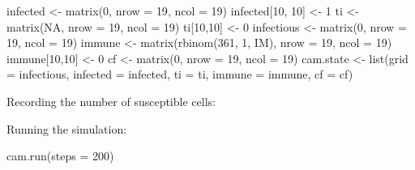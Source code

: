 \documentclass[
  12pt,
  a4paper]{book}
\newenvironment{Shaded}{\begin{snugshade}}{\end{snugshade}}
\newcommand{\AttributeTok}[1]{\textcolor[rgb]{0.77,0.63,0.00}{#1}}
\newcommand{\ConstantTok}[1]{\textcolor[rgb]{0.00,0.00,0.00}{#1}}
\newcommand{\DecValTok}[1]{\textcolor[rgb]{0.00,0.00,0.81}{#1}}
\newcommand{\FunctionTok}[1]{\textcolor[rgb]{0.00,0.00,0.00}{#1}}
\newcommand{\NormalTok}[1]{#1}
\newcommand{\OtherTok}[1]{\textcolor[rgb]{0.56,0.35,0.01}{#1}}
\newcommand{\SpecialCharTok}[1]{\textcolor[rgb]{0.00,0.00,0.00}{#1}}
\begin{document}
\begin{Shaded}
\begin{Highlighting}[]
\NormalTok{infected }\OtherTok{\textless{}{-}} \FunctionTok{matrix}\NormalTok{(}\DecValTok{0}\NormalTok{, }\AttributeTok{nrow =} \DecValTok{19}\NormalTok{, }\AttributeTok{ncol =} \DecValTok{19}\NormalTok{)}
\NormalTok{infected[}\DecValTok{10}\NormalTok{, }\DecValTok{10}\NormalTok{] }\OtherTok{\textless{}{-}} \DecValTok{1}
\NormalTok{ti }\OtherTok{\textless{}{-}} \FunctionTok{matrix}\NormalTok{(}\ConstantTok{NA}\NormalTok{, }\AttributeTok{nrow =} \DecValTok{19}\NormalTok{, }\AttributeTok{ncol =} \DecValTok{19}\NormalTok{)}
\NormalTok{ti[}\DecValTok{10}\NormalTok{,}\DecValTok{10}\NormalTok{] }\OtherTok{\textless{}{-}} \DecValTok{0}
\NormalTok{infectious }\OtherTok{\textless{}{-}} \FunctionTok{matrix}\NormalTok{(}\DecValTok{0}\NormalTok{, }\AttributeTok{nrow =} \DecValTok{19}\NormalTok{, }\AttributeTok{ncol =} \DecValTok{19}\NormalTok{)}
\NormalTok{immune }\OtherTok{\textless{}{-}} \FunctionTok{matrix}\NormalTok{(}\FunctionTok{rbinom}\NormalTok{(}\DecValTok{361}\NormalTok{, }\DecValTok{1}\NormalTok{, IM), }\AttributeTok{nrow =} \DecValTok{19}\NormalTok{, }\AttributeTok{ncol =} \DecValTok{19}\NormalTok{)}
\NormalTok{immune[}\DecValTok{10}\NormalTok{,}\DecValTok{10}\NormalTok{] }\OtherTok{\textless{}{-}} \DecValTok{0}
\NormalTok{cf }\OtherTok{\textless{}{-}} \FunctionTok{matrix}\NormalTok{(}\DecValTok{0}\NormalTok{, }\AttributeTok{nrow =} \DecValTok{19}\NormalTok{, }\AttributeTok{ncol =} \DecValTok{19}\NormalTok{)}
\NormalTok{cam.state }\OtherTok{\textless{}{-}} \FunctionTok{list}\NormalTok{(}\AttributeTok{grid =}\NormalTok{ infectious, }\AttributeTok{infected =}\NormalTok{ infected, }\AttributeTok{ti =}\NormalTok{ ti,}
                  \AttributeTok{immune =}\NormalTok{ immune, }\AttributeTok{cf =}\NormalTok{ cf)}
\end{Highlighting}
\end{Shaded}

Recording the number of susceptible cells:

\begin{Shaded}
\end{Shaded}

Running the simulation:

\begin{Shaded}
\begin{Highlighting}[]
\FunctionTok{cam.run}\NormalTok{(}\AttributeTok{steps =} \DecValTok{200}\NormalTok{)}
\end{Highlighting}
\end{Shaded}
\end{document}
